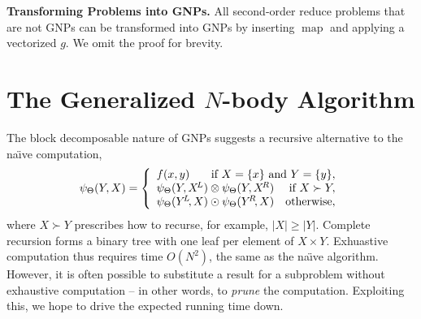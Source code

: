 \documentclass{article}
\newtheorem{lemma}{Lemma}
\newtheorem{example} {Example}
\newcommand{\killspace}{\vspace{-0.08in}}
\newcommand{\mysection}[1]{\vspace{-0.04in}\section{#1}\killspace}
\newcommand{\GNP}[1][\psi]{{#1}_{\Theta}}
\DeclareMathOperator*{\map}{map}
\newcommand{\comp}{\mathbin{\circ}}
\newcommand{\kdleft}[1]{#1^{\!L}}
\newcommand{\kdright}[1]{#1^{\!R}}
\begin{document}
{\bf Transforming Problems into GNPs.}
All second-order reduce problems that are not GNPs can be transformed into GNPs by inserting $\map$ and applying a vectorized $g$.
We omit the proof for brevity.
% 

\mysection{The Generalized $N$-body Algorithm}

The block decomposable nature of GNPs suggests a recursive alternative
to the na\"{\i}ve computation,
\[
\GNP(Y,X) = \left\{ \begin{array}{lrr}
  f(x,y) & \multicolumn{2}{r}{\mbox{\rm if } X = \{x\} \mbox{ \rm and } Y = \{y\},} \\
  \multicolumn{2}{l}{\GNP(Y,\kdleft{X}) \otimes \GNP(Y,\kdright{X})} & \mbox{\rm if } X \succ Y, \\
  \multicolumn{2}{l}{\GNP(\kdleft{Y}\!,X) \odot \GNP(\kdright{Y}\!,X)} & \mbox{\rm otherwise},
\end{array} \right.
\]
where $X \succ Y$ prescribes how to recurse,
for example, $|X| \geq |Y|$.
Complete recursion forms a binary tree with one leaf per
element of $X \times Y$.  Exhuastive computation thus requires time
$O(N^2)$, the same as the na\"{\i}ve algorithm.
However, it is often possible to substitute a result for a subproblem without exhaustive computation -- in other words, to {\it prune} the computation.
Exploiting this, we hope to drive the expected running time down.
\end{document}
